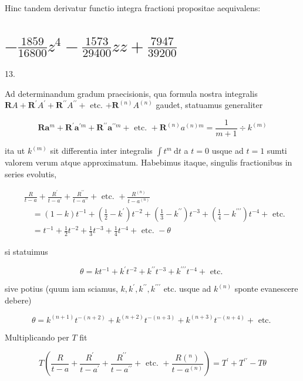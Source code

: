 \documentclass[10pt]{article}
\begin{document}
Hinc tandem derivatur functio integra fractioni propositae aequivalens:

\section*{\(-\frac{1859}{16800} z^{4}-\frac{1573}{29400} z z+\frac{7947}{39200}\)}
13.

Ad determinandum gradum praecisionis, qua formula nostra integralis \(\boldsymbol{R} A+\boldsymbol{R}^{\prime} A^{\prime}+\boldsymbol{R}^{\prime \prime} A^{\prime \prime}+\) etc. \(+\boldsymbol{R}^{(n)} A^{(n)}\) gaudet, statuamus generaliter

\[
\boldsymbol{R} \boldsymbol{a}^{m}+\boldsymbol{R}^{\prime} \boldsymbol{a}^{\prime m}+\boldsymbol{R}^{\prime \prime} \boldsymbol{a}^{\prime \prime m}+\text { etc. }+\boldsymbol{R}^{(n)} a^{(n) m}=\frac{1}{m+1} \div k^{(m)}
\]

ita ut \(k^{(m)}\) sit differentia inter integralis \(\int t^{m} \mathrm{~d} t\) a \(t=0\) usque ad \(t=1\) sumti valorem verum atque approximatum. Habebimus itaque, singulis fractionibus in series evolutis,

\[
\begin{aligned}
& \frac{R}{t-a}+\frac{R^{\prime}}{t-a^{\prime}}+\frac{R^{\prime \prime}}{t-a^{\prime \prime}}+\text { etc. }+\frac{R^{(n)}}{t-a^{(n)}} \\
& \quad=(1-k) t^{-1}+\left(\frac{1}{2}-k^{\prime}\right) t^{-2}+\left(\frac{1}{3}-k^{\prime \prime}\right) t^{-3}+\left(\frac{1}{4}-k^{\prime \prime \prime}\right) t^{-4}+\text { etc. } \\
& \quad=t^{-1}+\frac{1}{2} t^{-2}+\frac{1}{3} t^{-3}+\frac{1}{4} t^{-4}+\text { etc. }-\theta
\end{aligned}
\]

si statuimus

\[
\theta=k t^{-1}+k^{\prime} t^{-2}+k^{\prime \prime} t^{-3}+k^{\prime \prime \prime} t^{-4}+\text { etc. }
\]

sive potius (quum iam sciamus, \(k, k^{\prime}, k^{\prime \prime}, k^{\prime \prime \prime}\) etc. usque ad \(k^{(n)}\) sponte evanescere debere)

\[
\theta=k^{(n+1)} t^{-(n+2)}+k^{(n+2)} t^{-(n+3)}+k^{(n+3)} t^{-(n+4)}+\text { etc. }
\]

Multiplicando per \(T\) fit

\[
T\left(\frac{R}{t-a}+\frac{R^{\prime}}{t-a^{\prime}}+\frac{R^{\prime \prime}}{t-a^{\prime \prime}}+\text { etc. }+\frac{R\left({ }^{n}\right)}{t-a^{(n)}}\right)=T^{\prime}+T^{\prime \prime}-T \theta
\]
\end{document}
